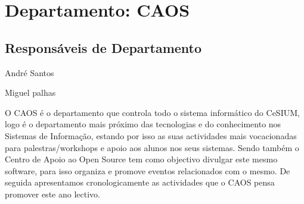 \section{Departamento: CAOS}

\subsection{Responsáveis de Departamento}
\begin{itemizedash}
	\item André Santos
	\item Miguel palhas
\end{itemizedash}


\indent O CAOS é o departamento que controla todo o sistema informático do CeSIUM, logo é o departamento mais próximo das tecnologias e do conhecimento nos Sistemas de Informação, estando por isso as suas actividades mais vocacionadas para palestras/workshops e apoio aos alunos nos seus sistemas. Sendo também o Centro de Apoio ao Open Source tem como objectivo divulgar este mesmo software, para isso organiza e promove eventos relacionados com o mesmo. De seguida apresentamos cronologicamente as actividades que o CAOS pensa promover este ano lectivo.\\
